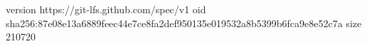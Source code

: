 version https://git-lfs.github.com/spec/v1
oid sha256:87e08e13a6889feec44e7ce8fa2def950135e019532a8b5399b6fca9e8e52c7a
size 210720

